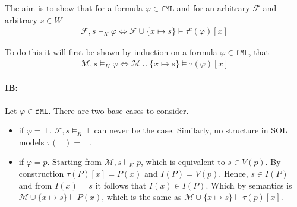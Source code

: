 \documentclass[11pt,a4paper]{article}
\begin{document}
The aim is to show that for a formula $\varphi \in \mathtt{fML} $ and for an arbitrary $\mathcal{F}$ and arbitrary $s \in W$
\begin{equation*}
\begin{split}
\mathcal{F} ,s\models_{K} \varphi \iff \mathcal{F} \cup \{ x \mapsto s\}  \models \tau^c(\varphi)[x]
\end{split}
\end{equation*}

To do this it will first be shown by induction on a formula $\varphi \in \mathtt{fML} $, that 
\begin{equation*}
\begin{split}
\mathcal{M} ,s\models_{K} \varphi \iff \mathcal{M} \cup \{x \mapsto s\} \models \tau(\varphi)[x]
\end{split}
\end{equation*}


\paragraph*{IB:}
Let $\varphi \in \mathtt{fML} $. There are two base cases to consider.
\begin{itemize}
\item if $\varphi = \bot$. $\mathcal{F} ,s\models_{K} \bot$ can never be the case. Similarly, no structure in SOL models $\tau(\bot)= \bot$.

\item if $\varphi = p$. Starting from $\mathcal{M} ,s\models_{K} p $, which is equivalent to  $s \in V(p)$. By construction $\tau(P)[x]=P(x)$ and $I(P)=V(p)$. Hence, $s \in I(P)$ and from $I(x) = s$ it follows that $I(x) \in I(P)$. Which by semantics is $\mathcal{M} \cup \{x \mapsto s\} \models P(x)$, which is the same as $\mathcal{M} \cup \{x \mapsto s\} \models \tau(p)[x]$.
\end{itemize}
\end{document}
